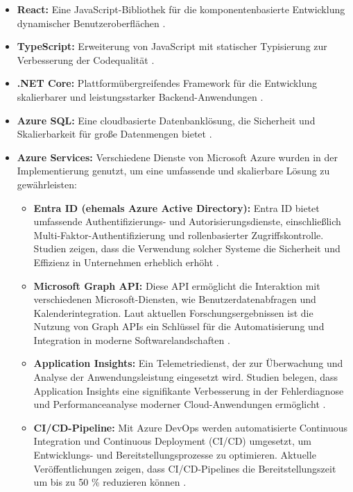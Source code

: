 \begin{itemize}
    \item \textbf{React:} Eine JavaScript-Bibliothek für die komponentenbasierte Entwicklung dynamischer Benutzeroberflächen \cite{stefanov2021react}.
    \item \textbf{TypeScript:} Erweiterung von JavaScript mit statischer Typisierung zur Verbesserung der Codequalität \cite{typeScriptDocumentation}.
    \item \textbf{.NET Core:} Plattformübergreifendes Framework für die Entwicklung skalierbarer und leistungsstarker Backend-Anwendungen \cite{microsoftDotNet}.
    \item \textbf{Azure SQL:} Eine cloudbasierte Datenbanklösung, die Sicherheit und Skalierbarkeit für große Datenmengen bietet \cite{azureDocumentation}.
    \item \textbf{Azure Services:} Verschiedene Dienste von Microsoft Azure wurden in der Implementierung genutzt, um eine umfassende und skalierbare Lösung zu gewährleisten:
    \begin{itemize}
       \item \textbf{Entra ID (ehemals Azure Active Directory):} Entra ID bietet umfassende Authentifizierungs- und Autorisierungsdienste, einschließlich Multi-Faktor-Authentifizierung und rollenbasierter Zugriffskontrolle. Studien zeigen, dass die Verwendung solcher Systeme die Sicherheit und Effizienz in Unternehmen erheblich erhöht \cite{microsoftEntraID, woods2020authentication}.
\item \textbf{Microsoft Graph API:} Diese API ermöglicht die Interaktion mit verschiedenen Microsoft-Diensten, wie Benutzerdatenabfragen und Kalenderintegration. Laut aktuellen Forschungsergebnissen ist die Nutzung von Graph APIs ein Schlüssel für die Automatisierung und Integration in moderne Softwarelandschaften \cite{microsoftGraphAPI, smith2021graph}.
\item \textbf{Application Insights:} Ein Telemetriedienst, der zur Überwachung und Analyse der Anwendungsleistung eingesetzt wird. Studien belegen, dass Application Insights eine signifikante Verbesserung in der Fehlerdiagnose und Performanceanalyse moderner Cloud-Anwendungen ermöglicht \cite{microsoftAppInsights, li2021monitoring}.
\item \textbf{CI/CD-Pipeline:} Mit Azure DevOps werden automatisierte Continuous Integration und Continuous Deployment (CI/CD) umgesetzt, um Entwicklungs- und Bereitstellungsprozesse zu optimieren. Aktuelle Veröffentlichungen zeigen, dass CI/CD-Pipelines die Bereitstellungszeit um bis zu 50 \% reduzieren können \cite{azureDevOps, fowler2020continuous}.

    \end{itemize}
\end{itemize}


